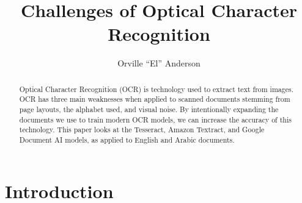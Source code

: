 \documentclass[sigplan,screen,nonacm]{acmart-tagged}
\begin{document}
\title{Challenges of Optical Character Recognition}
\author{Orville ``El'' Anderson}

\begin{abstract}
Optical Character Recognition (OCR) is technology used to extract text from images. OCR has three main weaknesses when applied to scanned documents stemming from page layouts, the alphabet used, and visual noise. By intentionally expanding the documents we use to train modern OCR models, we can increase the accuracy of this technology. This paper looks at the Tesseract, Amazon Textract, and Google Document AI models, as applied to English and Arabic documents.
\end{abstract}

\doclicenseThis



\maketitle

\section{Introduction}
\label{sec:introduction}
\end{document}
